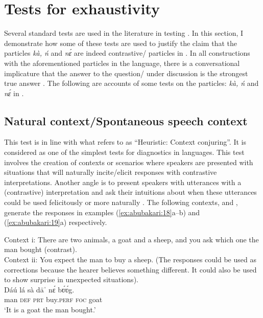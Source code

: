 \documentclass[output=paper,modfonts,nonflat,
\ChapterDOI{10.5281/zenodo.3367154}
 hidelinks
]{langsci/langscibook}
\begin{document}
\section{Tests for exhaustivity}

 
Several standard tests are used in the literature in testing . In this section, I demonstrate how some of these tests are used to justify the claim that the particles \textit{kà, ń} and \textit{nɛ́} are indeed contrastive{\slash} particles in . In all  constructions with the aforementioned particles in the language, there is a conversational implicature that the answer to the question/ under discussion is the strongest true answer \citep{Beaver2008,roberts2012}. The following are accounts of some tests on the particles: \textit{kà, ń} and \textit{nɛ́} in .
 

\subsection{Natural context/Spontaneous speech context}

This test is in line with what \citet{vanderWal2013} refers to as   ``Heuristic: Context conjuring''. It is considered as one of the simplest tests for  diagnostics in languages. This test involves the creation of contexts or scenarios where speakers are presented with situations that will naturally incite/elicit responses with contrastive  interpretations. Another angle is to present speakers with utterances with a (contrastive)  interpretation and ask their intuitions about when these utterances could be used felicitously or more naturally \citep[5]{vanderWal2013}. The following contexts,  and , generate the responses in examples (\ref{ex:abubakari:18}a--b) and (\ref{ex:abubakari:19}a) respectively.

 
\ea\label{ex:abubakari:18} 
Context i: There are two animals, a goat and a sheep, and you ask which one the       man bought (contrast).\\
 
 
Context ii: You expect the man to buy a sheep. (The responses could be used as   corrections because the hearer believes something different. It could also be used to show surprise in unexpected situations).\\
 
\ea\label{ex:abubakari:18a}
\gll Dáú  lá  sà  dāˈ    nɛ́  bʋ́ʋ́g.\\
man  \textsc{def}  \textsc{prt}  buy.\textsc{perf}  \textsc{foc}  goat\\
\glt ‘It is a goat the man bought.’
\end{document}
